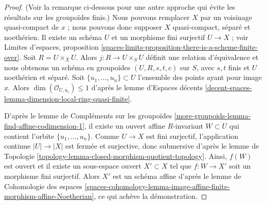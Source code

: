 \begin{proof}
(Voir la remarque ci-dessous pour une autre approche qui évite les résultats sur
les groupoïdes finis.) Nous pouvons remplacer $X$ par un voisinage quasi-compact
de $x$ ; nous pouvons donc supposer $X$ quasi-compact, séparé et noethérien.
Il existe un schéma $U$ et un morphisme fini surjectif $U \to X$ ;
voir Limites d'espaces, proposition
\ref{spaces-limits-proposition-there-is-a-scheme-finite-over}.
Soit $R = U \times_X U$. Alors $j : R \to U \times_S U$ définit une relation
d'équivalence et nous obtenons un schéma en groupoïdes $(U, R, s, t, c)$ sur $S$,
avec $s, t$ finis et $U$ noethérien et séparé.
Soit $\{u_1, \ldots, u_n\} \subset U$ l'ensemble des points ayant pour image $x$.
Alors $\dim(\mathcal{O}_{U, u_i}) \leq 1$ d'après le
lemme d'Espaces décents
\ref{decent-spaces-lemma-dimension-local-ring-quasi-finite}.

\medskip\noindent
D'après le lemme de Compléments sur les groupoïdes
\ref{more-groupoids-lemma-find-affine-codimension-1},
il existe un ouvert affine $R$-invariant $W \subset U$ qui contient
l'orbite $\{u_1, \ldots, u_n\}$. Comme $U \to X$ est fini surjectif,
l'application continue $|U| \to |X|$ est fermée et surjective, donc
submersive d'après le lemme de Topologie
\ref{topology-lemma-closed-morphism-quotient-topology}.
Ainsi, $f(W)$ est ouvert et il existe un sous-espace ouvert $X' \subset X$
tel que $f : W \to X'$ soit un morphisme fini surjectif.
Alors $X'$ est un schéma affine d'après le
lemme de Cohomologie des espaces
\ref{spaces-cohomology-lemma-image-affine-finite-morphism-affine-Noetherian},
ce qui achève la démonstration.
\end{proof}

